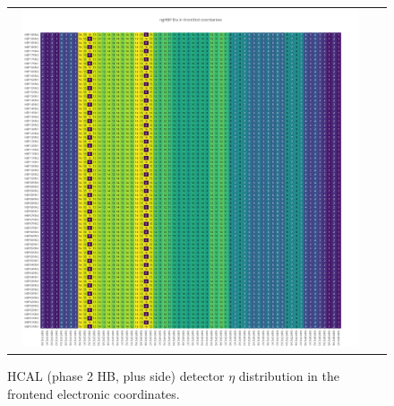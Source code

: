 \begin{figure}[htb]
 \begin{center}
  \begin{tabular}{cc}
   \includegraphics[angle=0,width=0.95\textwidth]{figures/appendix/ngHBP_Eta_in_FrontEnd.png}
  \end{tabular}
	\caption{HCAL (phase 2 HB, plus side) detector $\eta$ distribution in the frontend electronic coordinates.}
  \label{fig:lmapngHBPEtaFEC}
 \end{center}
\end{figure}
\clearpage

